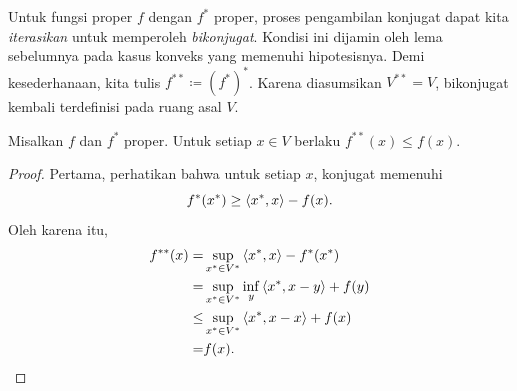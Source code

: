 Untuk fungsi proper $f$ dengan $f^*$ proper, proses pengambilan konjugat dapat kita \emph{iterasikan} untuk memperoleh \emph{bikonjugat}. Kondisi ini dijamin oleh lema sebelumnya pada kasus konveks yang memenuhi hipotesisnya. Demi kesederhanaan, kita tulis $f^{**} \coloneq (f^*)^*$. Karena diasumsikan $V^{**}=V$, bikonjugat kembali terdefinisi pada ruang asal $V$.

\begin{lemma}
    Misalkan $f$ dan $f^*$ proper. Untuk setiap $x\in V$ berlaku $f^{**}(x)\leq f(x)$.
\end{lemma}
\begin{proof}
    Pertama, perhatikan bahwa untuk setiap $x$, konjugat memenuhi
    \begin{equation}
        f^*(x^*)\geq \left\langle x^* , x\right\rangle-f(x).
    \end{equation}
    Oleh karena itu,
    \begin{equation}
        \begin{aligned}
            f^{**}(x)
            =& \sup_{x^*\in V^*}\left\langle x^* , x\right\rangle - f^*(x^*)\\
            =& \sup_{x^*\in V^*}\inf_y \left\langle x^* , x-y\right\rangle + f(y)\\
            \leq& \sup_{x^*\in V^*} \left\langle x^* , x-x\right\rangle + f(x)\\
            =& f(x).
        \end{aligned}
    \end{equation}
\end{proof}

